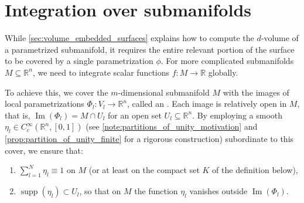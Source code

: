 
\section{Integration over submanifolds}
\label{sec:integration_over_submanifolds}

While \cref{sec:volume_embedded_surfaces} explains how to compute the $d$-volume of a parametrized submanifold, it requires the entire relevant portion of the surface to be covered by a single parametrization $\phi$. For more complicated submanifolds $M \subseteq \mathbb{R}^n$, we need to integrate scalar functions $f : M \to \mathbb{R}$ globally. 

To achieve this, we cover the $m$-dimensional submanifold $M$ with the images of local parametrizations $\Phi_l : V_l \to \mathbb{R}^n$, called an . Each image is relatively open in $M$, that is, $\operatorname{Im}(\Phi_l) = M \cap U_l$ for an open set $U_l \subseteq \mathbb{R}^n$. By employing a smooth  $\eta_l \in C_c^\infty(\mathbb{R}^n, [0,1])$ (see \cref{note:partitions_of_unity_motivation} and \cref{prop:partition_of_unity_finite} for a rigorous construction) subordinate to this cover, we ensure that:
\begin{enumerate}[label=\textbf{(\alph*)}]
    \item $\sum_{l=1}^N \eta_l \equiv 1$ on $M$ (or at least on the compact set $K$ of the
      definition below),
    \item $\operatorname{supp}(\eta_l) \subset U_l$, so that on $M$ the function $\eta_l$
      vanishes outside $\operatorname{Im}(\Phi_l)$.
\end{enumerate}

